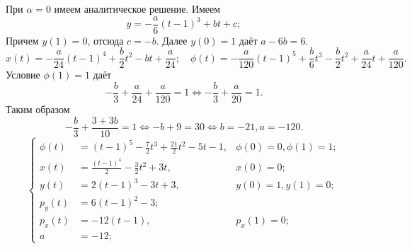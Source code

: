 При $\alpha=0$ имеем аналитическое решение. Имеем
\[
  y = -\frac a6(t-1)^3 + bt + c;
\]
Причем $y(1)=0$, отсюда $c = -b$. Далее $y(0)=1$ даёт $a - 6b = 6$.
\[
  x(t) = -\frac a{24}(t-1)^4 + \frac b2 t^2 - bt + \frac a{24};\quad
  \phi(t) = -\frac a{120}(t-1)^5 + \frac b6 t^3 - \frac b2 t^2 + \frac a{24}t + \frac a{120}.
\]
Условие $\phi(1)=1$ даёт 
\[
  -\frac b3 + \frac a{24} + \frac a{120} = 1\iff -\frac b3 + \frac a{20} = 1.
\]
Таким образом
\[
  -\frac b3 + \frac{3+3b}{10} = 1\iff  -b + 9 = 30 \iff b = -21, a = -120.
\]
\[\left\{
\begin{aligned}
  \phi(t) &=  (t-1)^5  - \frac72 t^3 + \frac{21}2 t^2 - 5 t -1,	& \phi(0)=0, \phi(1)=1;\\
  x(t)    &=  \frac{(t-1)^4}2 - \frac32 t^2 + 3 t,		& x(0)=0;\\
  y(t) &= 2(t-1)^3 - 3 t + 3,					& y(0)=1, y(1)=0;\\
  p_y(t) &= 6(t-1)^2 - 3;\\
  p_x(t) &= -12(t-1),						& p_x(1)=0;\\
  a &=  -12;
\end{aligned}\right.
\]
